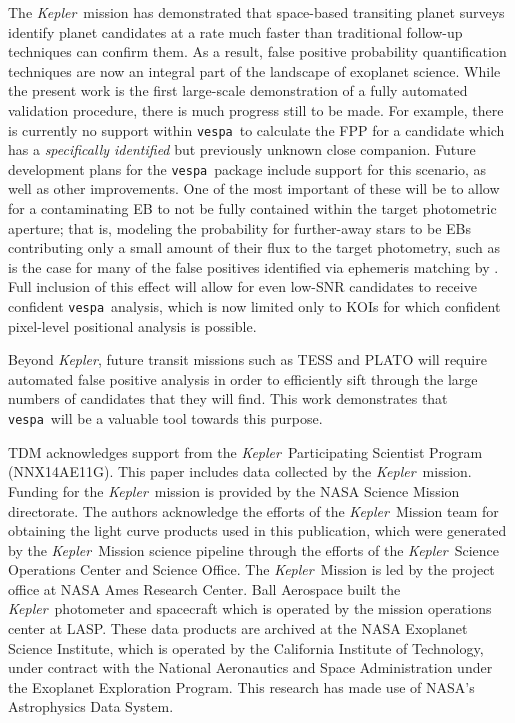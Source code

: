 \documentclass{emulateapj}
\newcommand{\kepler}{\textit{Kepler}}
\newcommand{\vespa}{\texttt{vespa}}
\begin{document}
The \kepler\ mission has demonstrated that space-based transiting
planet surveys identify planet candidates at a rate much faster than
traditional follow-up techniques can confirm them.  As a result, false
positive probability quantification techniques are now an integral
part of the landscape of exoplanet science.  While the present work is
the first large-scale demonstration of a fully automated validation
procedure, there is much progress still to be made.  For example,
there is currently no support within \vespa\ to calculate the FPP for
a candidate which has a \emph{specifically identified} but previously
unknown close companion.  Future development plans for the
\vespa\ package include support for this scenario, as well as other
improvements.  One of the most important of these will be to allow for
a contaminating EB to not be fully contained within the target
photometric aperture; that is, modeling the probability for
further-away stars to be EBs contributing only a small amount of their
flux to the target photometry, such as is the case for many of the
false positives identified via ephemeris matching by
\citet{Coughlin:2014}.  Full inclusion of this effect will allow for
even low-SNR candidates to receive confident \vespa\ analysis, which
is now limited only to KOIs for which confident pixel-level positional
analysis is possible.

Beyond \kepler, future transit missions such as TESS and PLATO will
require automated false positive analysis in order to efficiently sift
through the large numbers of candidates that they will find.  This
work demonstrates that \vespa\ will be a valuable tool towards this
purpose.



\acknowledgments TDM acknowledges support from the \kepler\
Participating Scientist Program (NNX14AE11G). This paper includes data
collected by the \kepler\ mission. Funding for the \kepler\ mission
is provided by the NASA Science Mission directorate. The authors
acknowledge the efforts of the \kepler\ Mission team for obtaining
the light curve products used in
this publication, which were generated by the \kepler\ Mission
science pipeline through the efforts of the \kepler\ Science
Operations Center and Science Office. The \kepler\ Mission is led by
the project office at NASA Ames Research Center. Ball Aerospace built
the \kepler\ photometer and spacecraft which is operated by the
mission operations center at LASP. These data products are archived at
the NASA Exoplanet Science Institute, which is operated by the
California Institute of Technology, under contract with the National
Aeronautics and Space Administration under the Exoplanet Exploration
Program. This research has made use of NASA's Astrophysics Data
System. 
\end{document}
